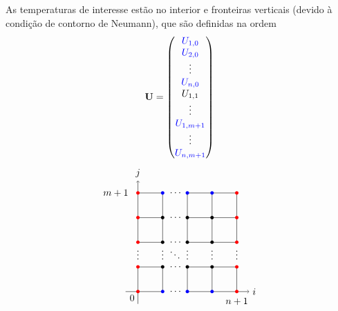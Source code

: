 \documentclass{article}
\begin{document}
    As temperaturas de interesse estão no interior e fronteiras verticais (devido à condição de contorno de Neumann), que são definidas na ordem
    \[\mathbf{U} = \begin{pmatrix}
        \color{blue}{U_{1,0}}\\
        \color{blue}{U_{2,0}}\\
        \vdots\\
        \color{blue}{U_{n,0}}\\
        U_{1,1}\\
        \vdots\\
        \color{blue}{U_{1,m+1}}\\
        \vdots\\
        \color{blue}{U_{n,m+1}}
    \end{pmatrix}\]
    \[\begin{tikzpicture}[scale=0.9, x=1cm, y=1cm]

        \draw (1,0) -- (1,1); \draw (1,2) -- (1,4);
        \draw (2,0) -- (2,1); \draw (2,2) -- (2,4);
        \draw (3,0) -- (3,1); \draw (3,2) -- (3,4);
        \draw (4,0) -- (4,1); \draw (4,2) -- (4,4);

        \draw (0,1) -- (1,1); \draw (2,1) -- (4,1);
        \draw (0,2) -- (1,2); \draw (2,2) -- (4,2);
        \draw (0,3) -- (1,3); \draw (2,3) -- (4,3);
        \draw (0,4) -- (1,4); \draw (2,4) -- (4,4);

        \node at (1.55,0) {$\cdots$};
        \node at (1.55,1) {$\cdots$};
        \node at (1.55,2) {$\cdots$};
        \node at (1.55,3) {$\cdots$};
        \node at (1.55,4) {$\cdots$};

        \node at (0,1.6) {$\vdots$};
        \node at (1,1.6) {$\vdots$};
        \node at (2,1.6) {$\vdots$};
        \node at (3,1.6) {$\vdots$};
        \node at (4,1.6) {$\vdots$};

        \node at (1.5,1.6) {$\ddots$};

        \draw[-] (-0.5,0) -- (1,0);
        \draw[->] (2,0) -- (4+0.5,0) node[right] {$i$};
        \draw[-] (0,-0.5) -- (0,1);
        \draw[->] (0,2) -- (0,4+0.5) node[above] {$j$};

        \foreach \i in {1,2,3}
        \foreach \j in {0,4}
            \fill[blue] (\i,\j) circle (2pt);

        \foreach \i in {0,4}
        \foreach \j in {0,1,2,3,4}
            \fill[red] (\i,\j) circle (2pt);

        \foreach \i in {1,2,3}
        \foreach \j in {1,2,3}
            \fill (\i,\j) circle (2pt);


        \node at (4,-0.4) {$n+1$};
        \node at (-0.9,4) {$m+1$};
        \node[below left] at (0,0) {$0$};

    \end{tikzpicture}\]
\end{document}
